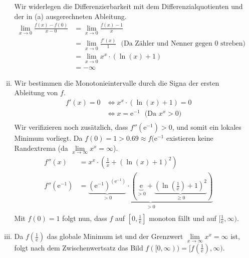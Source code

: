 \documentclass{scrreprt}
\newcommand{\round}[1]{\left(#1\right)}
\newcommand{\euler}{\mathrm{e}}
\begin{document}
\begin{enumerate}[(a)]
\begin{enumerate}[(i)]
        Wir widerlegen die Differenzierbarkeit mit dem Differenzialquotienten und der in (a) ausgerechneten Ableitung.
        \begin{align*}
            \lim\limits_{x \to 0} \frac{f\round{x} - f\round{0}}{x-0} & = \lim\limits_{x \to 0} \frac{f\round{x} - 1}{x}\\
            & \overset{🏥}{=} \lim\limits_{x \to 0} \frac{f'\round{x}}{1} ~~~\text{(Da Zähler und Nenner gegen 0 streben)}\\
            & = \lim\limits_{x \to 0} x^x \cdot \round{\ln\round{x} + 1}\\
            & = -\infty
        \end{align*}
    \item
        Wir bestimmen die Monotonieintervalle durch die Signa der ersten Ableitung von $f$.
        \begin{align*}
            f'(x) = 0 &\Leftrightarrow x^x \cdot \round{\ln(x) + 1} = 0\\
            & \Leftrightarrow x = \euler^{-1} ~~~ \text{(Da $x^x > 0$)}\\
        \end{align*}
        Wir verifizieren noch zusätzlich, dass $f''(\euler^{-1})>0$, und somit ein lokales Minimum vorliegt. Da $f(0)= 1 > 0.69 \approx f(\euler^{-1}$ existieren keine Randextrema (da $\lim\limits_{x \to \infty} x^x = \infty$).
        \begin{align*}
            f''(x) & = x^x \cdot \round{\frac{1}{x} + \round{\ln\round{x} + 1}^2}\\
            f''(\euler^{-1}) & = \underbrace{ \underbrace{\round{\euler^{-1}}^{\round{\euler^{-1}}}}_{>0} \cdot \round{\underbrace{\euler}_{>0} + \underbrace{\round{\ln\round{\frac{1}{\euler}} + 1}^2}_{\geq0}}}_{>0}\\
        \end{align*}
        Mit $f(0) =1$ folgt nun, dass $f$ auf $[0,\frac{1}{\euler}]$ monoton fällt und auf $[\frac{1}{\euler},\infty)$.
    \item
        Da $f(\frac{1}{\euler})$ das globale Minimum ist und der Grenzwert $\lim\limits_{x \to \infty} x^x = \infty$ ist, folgt nach dem Zwischenwertsatz das Bild $f([0,\infty)) = [f\round{\frac{1}{\euler}}, \infty)$.
    \end{enumerate}
\end{enumerate}

\pagebreak
\end{document}
